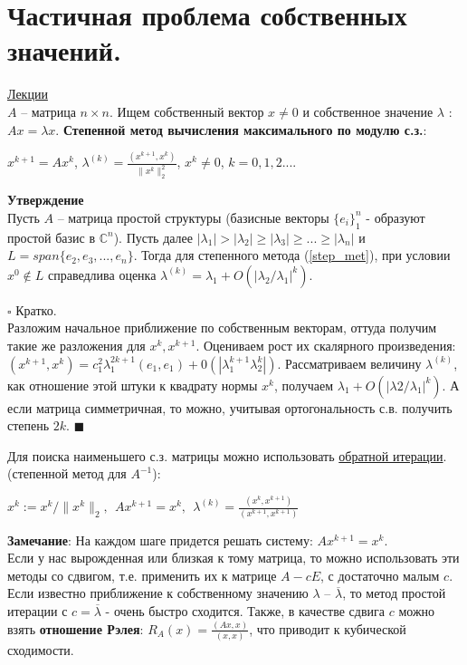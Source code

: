 \documentclass[specialist, subf, href, colorlinks=true, 12pt, times, mtpro, final]{disser}
\theoremstyle{definition}
\begin{document}
{\section {Частичная проблема собственных значений.}
    \hyperlink {lects.78}{Лекции}\\
    $A$ \--- матрица $n\times n$. Ищем собственный вектор $x \ne 0$ и собственное значение $\lambda$ : $Ax = \lambda x$.
    \textbf{Степенной метод вычисления максимального по модулю с.з.}:\\
    \begin{center}
    \label{step_met}
    $x^{k+1} = Ax^k$,  $\lambda^{(k)} = \frac{(x^{k+1}, x^k)}{\|x^k\|^2_2}$, $x^k \ne 0$,  $k=0,1,2...$.
    \end{center}
    \textbf{Утверждение}\\
    Пусть $A$ \--- матрица простой структуры (базисные векторы $\{e_i\}^n_1$ - образуют простой базис в $\mathbb{C}^n$). Пусть далее $|\lambda_1| > |\lambda_2| \geq |\lambda_3| \geq ... \geq |\lambda_n|$ и $L=span\{e_2,e_3,...,e_n\}$. Тогда для степенного метода (\ref{step_met}), при условии $x^0 \notin L$ справедлива оценка $\lambda^{(k)} = \lambda_1 + O(|\lambda_2/\lambda_1|^k)$.
    
    \noindent$\square$ Кратко.\\
    Разложим начальное приближение по собственным векторам, оттуда получим такие же разложения для $x^k, x^{k+1}$. Оцениваем рост их скалярного произведения: $(x^{k+1}, x^k) = c^2_1 \lambda^{2k+1}_1 (e_1, e_1) + 0(|\lambda^{k+1}_1\lambda^k_2|)$.
    Рассматриваем величину $\lambda^{(k)}$, как отношение этой штуки к квадрату нормы $x^k$,  получаем $\lambda_1 + O(|\lambda2/\lambda_1|^k)$. А если матрица симметричная, то можно, учитывая ортогональность с.в. получить степень $2k$. 
    $\blacksquare$
    
    
    Для поиска наименьшего с.з. матрицы можно использовать \hyperlink{lects.79}{ обратной итерации}. (степенной метод для $A^{-1}$):
    \begin{center}
    $x^k := x^k / \|x^k\|_2,\ \  Ax^{k+1} = x^k,\ \  \lambda^{(k)} = \frac{(x^k, x^{k+1})}{(x^{k+1}, x^{k+1})}$
    \end{center}
    
    \noindent\textbf{Замечание}: На каждом шаге придется решать систему: $Ax^{k+1} = x^k$.
\\
Если у нас вырожденная или близкая к тому матрица, то можно использовать эти методы со сдвигом, т.е. применить их к матрице $A-cE$, с достаточно малым $c$.  Если известно приближение к собственному значению $\lambda$ \--- $\overline{\lambda}$, то метод простой итерации с $c = \overline{\lambda}$ - очень быстро сходится. Также, в качестве сдвига $c$ можно взять \textbf{отношение Рэлея}: $R_A(x) = \frac{(Ax, x)}{(x, x)}$, что приводит к кубической сходимости.
    
}
\end{document}
